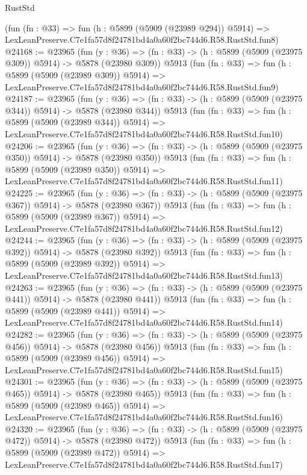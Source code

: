\begin{lexlean}{RustStd}
\begin{coremodule}
{{    (fun (fn : @33) =>
    fun (h : @5899 (@5909 (@23989 @294)) @5914) =>
    LexLeanPreserve.C7e1fa57d8f24781bd4a0a60f2bc744d6.R58.RustStd.fun8)
@24168 := @23965
    (fun (y : @36) => (fn : @33) -> (h : @5899 (@5909 (@23975 @309)) @5914) -> @5878 (@23980 @309))
    @5913
    (fun (fn : @33) =>
    fun (h : @5899 (@5909 (@23989 @309)) @5914) =>
    LexLeanPreserve.C7e1fa57d8f24781bd4a0a60f2bc744d6.R58.RustStd.fun9)
@24187 := @23965
    (fun (y : @36) => (fn : @33) -> (h : @5899 (@5909 (@23975 @344)) @5914) -> @5878 (@23980 @344))
    @5913
    (fun (fn : @33) =>
    fun (h : @5899 (@5909 (@23989 @344)) @5914) =>
    LexLeanPreserve.C7e1fa57d8f24781bd4a0a60f2bc744d6.R58.RustStd.fun10)
@24206 := @23965
    (fun (y : @36) => (fn : @33) -> (h : @5899 (@5909 (@23975 @350)) @5914) -> @5878 (@23980 @350))
    @5913
    (fun (fn : @33) =>
    fun (h : @5899 (@5909 (@23989 @350)) @5914) =>
    LexLeanPreserve.C7e1fa57d8f24781bd4a0a60f2bc744d6.R58.RustStd.fun11)
@24225 := @23965
    (fun (y : @36) => (fn : @33) -> (h : @5899 (@5909 (@23975 @367)) @5914) -> @5878 (@23980 @367))
    @5913
    (fun (fn : @33) =>
    fun (h : @5899 (@5909 (@23989 @367)) @5914) =>
    LexLeanPreserve.C7e1fa57d8f24781bd4a0a60f2bc744d6.R58.RustStd.fun12)
@24244 := @23965
    (fun (y : @36) => (fn : @33) -> (h : @5899 (@5909 (@23975 @392)) @5914) -> @5878 (@23980 @392))
    @5913
    (fun (fn : @33) =>
    fun (h : @5899 (@5909 (@23989 @392)) @5914) =>
    LexLeanPreserve.C7e1fa57d8f24781bd4a0a60f2bc744d6.R58.RustStd.fun13)
@24263 := @23965
    (fun (y : @36) => (fn : @33) -> (h : @5899 (@5909 (@23975 @441)) @5914) -> @5878 (@23980 @441))
    @5913
    (fun (fn : @33) =>
    fun (h : @5899 (@5909 (@23989 @441)) @5914) =>
    LexLeanPreserve.C7e1fa57d8f24781bd4a0a60f2bc744d6.R58.RustStd.fun14)
@24282 := @23965
    (fun (y : @36) => (fn : @33) -> (h : @5899 (@5909 (@23975 @456)) @5914) -> @5878 (@23980 @456))
    @5913
    (fun (fn : @33) =>
    fun (h : @5899 (@5909 (@23989 @456)) @5914) =>
    LexLeanPreserve.C7e1fa57d8f24781bd4a0a60f2bc744d6.R58.RustStd.fun15)
@24301 := @23965
    (fun (y : @36) => (fn : @33) -> (h : @5899 (@5909 (@23975 @465)) @5914) -> @5878 (@23980 @465))
    @5913
    (fun (fn : @33) =>
    fun (h : @5899 (@5909 (@23989 @465)) @5914) =>
    LexLeanPreserve.C7e1fa57d8f24781bd4a0a60f2bc744d6.R58.RustStd.fun16)
@24320 := @23965
    (fun (y : @36) => (fn : @33) -> (h : @5899 (@5909 (@23975 @472)) @5914) -> @5878 (@23980 @472))
    @5913
    (fun (fn : @33) =>
    fun (h : @5899 (@5909 (@23989 @472)) @5914) =>
    LexLeanPreserve.C7e1fa57d8f24781bd4a0a60f2bc744d6.R58.RustStd.fun17)
}}
\end{coremodule}
\end{lexlean}
